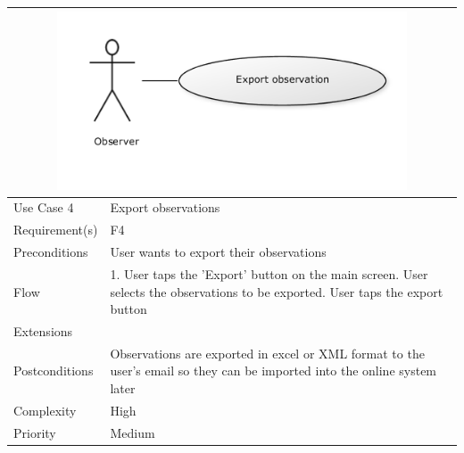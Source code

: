 \begin{tabular}[t]{|l|p{}|}
	\multicolumn{2}{c}{\includegraphics[width=0.8\textwidth]{reqspec/uc/export.png}}\\\hline
	Use Case 4&Export  observations\\\hline
	Requirement(s)&F4\\\hline
	Preconditions& User wants to export their observations \\\hline
	Flow&1. User taps the 'Export' button on the main screen\newline
	2. User selects the observations to be exported\newline
	3. User taps the export button\\\hline
	Extensions& \\\hline
	Postconditions&Observations are exported in excel or XML format to the user's email so they can be imported into the online system later\\\hline
	Complexity&High\\\hline
	Priority&Medium\\\hline
\end{tabular}

\hspace{2em}


